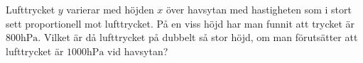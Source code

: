 \documentclass[11pt]{article}
\begin{document}
Lufttrycket $y$ varierar med höjden $x$ över havsytan med hastigheten som i stort sett proportionell mot lufttrycket. På en viss höjd har man funnit att trycket är $800\mathrm{hPa}$. Vilket är då lufttrycket på dubbelt så stor höjd, om man förutsätter att lufttrycket är $1000\mathrm{hPa}$ vid havsytan?
\end{document}
